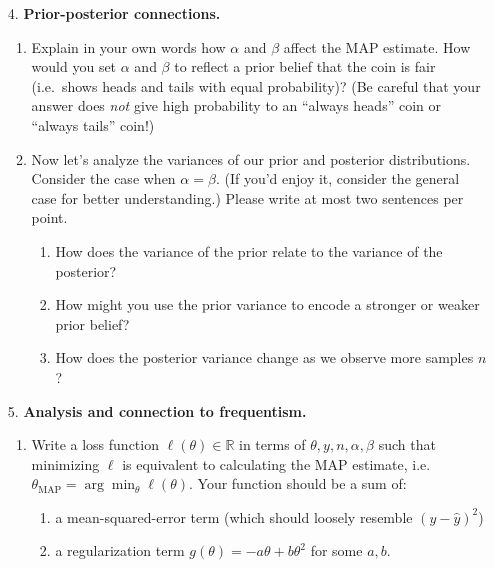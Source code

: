 \documentclass[submit]{harvardml}
\begin{document}
\begin{framed}
\begin{enumerate}
    \item[4.]
      \textbf{Prior-posterior connections.}

      \begin{enumerate}
        \item
              Explain in your own words how \(\alpha\) and \(\beta\) affect the
              MAP estimate. How would you set \(\alpha\) and \(\beta\) to reflect
              a prior belief that the coin is fair (i.e.~shows heads and tails
              with equal probability)? (Be careful that your answer does \emph{not} give high probability to an ``always heads'' coin or ``always tails'' coin!)

        \item Now let's analyze the variances of our prior and posterior distributions. Consider the case when $\alpha = \beta$. (If you'd enjoy it, consider the general case for better understanding.) Please write at most two sentences per point.
              \begin{enumerate}
                \item How does the variance of the prior relate to the variance of the posterior?
                \item How might you use the prior variance to encode a stronger or weaker prior belief?
                \item How does the posterior variance change as we observe more samples $n$?
              \end{enumerate}
      \end{enumerate}

    \item[5.]
      \textbf{Analysis and connection to frequentism.}

      \begin{enumerate}
        \item
              Write a loss function \(\ell(\theta) \in \mathbb{R}\) in terms of
              \(\theta, y, n, \alpha, \beta\) such that minimizing \(\ell\) is
              equivalent to calculating the MAP estimate,
              i.e.~\(\theta_{\text{MAP}} = \arg \min_{\theta} \ell(\theta)\). Your
              function should be a sum of:
              \begin{enumerate}
                \item a mean-squared-error term (which should loosely resemble $(y - \hat y)^2$)
                \item a
                      regularization term \(g(\theta) = - a \theta + b \theta^{2}\) for some $a, b$.
              \end{enumerate}


\end{enumerate}
\end{enumerate}
\end{framed}
\end{document}
